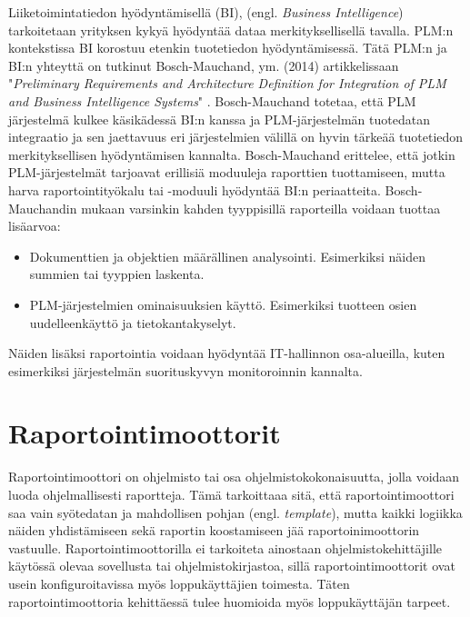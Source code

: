 Liiketoimintatiedon hyödyntämisellä (BI), (engl. \textit{Business Intelligence}) tarkoitetaan yrityksen kykyä hyödyntää dataa merkityksellisellä tavalla. PLM:n kontekstissa BI korostuu etenkin tuotetiedon hyödyntämisessä. Tätä PLM:n ja BI:n yhteyttä on tutkinut Bosch-Mauchand, ym. (2014) artikkelissaan "\textit{Preliminary Requirements and Architecture Definition for Integration of PLM and Business Intelligence Systems}" \cite{bayro-corrochano_preliminary_2014}. Bosch-Mauchand totetaa, että PLM järjestelmä kulkee käsikädessä BI:n kanssa ja PLM-järjestelmän tuotedatan integraatio ja sen jaettavuus eri järjestelmien välillä on hyvin tärkeää tuotetiedon merkityksellisen hyödyntämisen kannalta.
Bosch-Mauchand erittelee, että jotkin PLM-järjestelmät tarjoavat erillisiä moduuleja raporttien tuottamiseen, mutta harva raportointityökalu tai -moduuli hyödyntää BI:n periaatteita. Bosch-Mauchandin mukaan varsinkin kahden tyyppisillä raporteilla voidaan tuottaa lisäarvoa: \cite{bayro-corrochano_preliminary_2014}
\begin{itemize}
	\item Dokumenttien ja objektien määrällinen analysointi. Esimerkiksi näiden summien tai tyyppien laskenta.
	\item PLM-järjestelmien ominaisuuksien käyttö. Esimerkiksi tuotteen osien uudelleenkäyttö ja tietokantakyselyt.
\end{itemize}
Näiden lisäksi raportointia voidaan hyödyntää IT-hallinnon osa-alueilla, kuten esimerkiksi järjestelmän suorituskyvyn monitoroinnin kannalta.

\section{Raportointimoottorit} \label{Raportointimoottorit}

Raportointimoottori on ohjelmisto tai osa ohjelmistokokonaisuutta, jolla voidaan luoda ohjelmallisesti raportteja. Tämä tarkoittaaa sitä, että raportointimoottori saa vain syötedatan ja mahdollisen pohjan (engl. \textit{template}), mutta kaikki logiikka näiden yhdistämiseen sekä raportin koostamiseen jää raportoinimoottorin vastuulle. \cite{he_design_2010} Raportointimoottorilla ei tarkoiteta ainostaan ohjelmistokehittäjille käytössä olevaa sovellusta tai ohjelmistokirjastoa, sillä raportointimoottorit ovat usein konfiguroitavissa myös loppukäyttäjien toimesta. Täten raportointimoottoria kehittäessä tulee huomioida myös loppukäyttäjän tarpeet. \cite{adhi_performance_2019}

